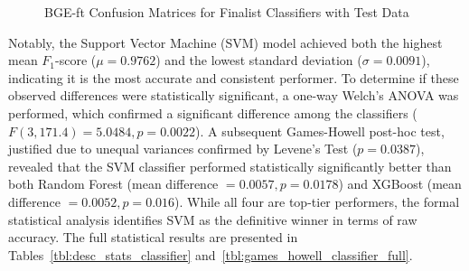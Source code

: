 \begin{figure}[tb]
    \captionsetup{skip=5pt}
    \centering
    \caption{BGE-ft Confusion Matrices for Finalist Classifiers with Test Data}
    \label{fig:classifier_cms}
\end{figure}

Notably, the Support Vector Machine (SVM) model achieved both the highest mean \(F_1\)-score (\(\mu = 0.9762\)) and the lowest standard deviation (\(\sigma = 0.0091\)), indicating it is the most accurate and consistent performer. To determine if these observed differences were statistically significant, a one-way Welch's ANOVA was performed, which confirmed a significant difference among the classifiers (\(F(3, 171.4) = 5.0484, p = 0.0022\)). A subsequent Games-Howell post-hoc test, justified due to unequal variances confirmed by Levene's Test (\(p=0.0387\)), revealed that the SVM classifier performed statistically significantly better than both Random Forest (mean difference \(= 0.0057, p=0.0178\)) and XGBoost (mean difference \(= 0.0052, p=0.016\)). While all four are top-tier performers, the formal statistical analysis identifies SVM as the definitive winner in terms of raw accuracy. The full statistical results are presented in Tables~\ref{tbl:desc_stats_classifier} and~\ref{tbl:games_howell_classifier_full}.


